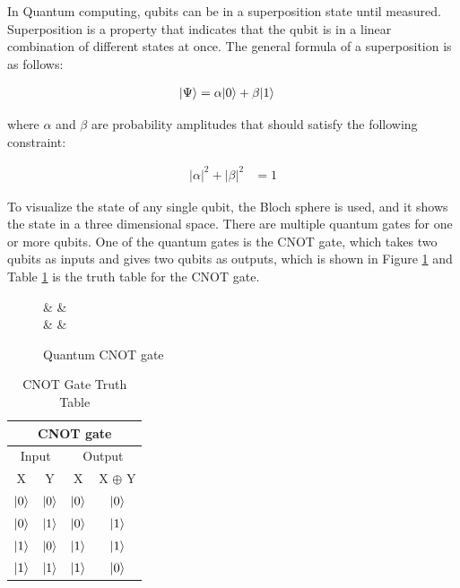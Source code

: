 \documentclass[12pt,a4paper]{article}
\DeclarePairedDelimiter\ket{\lvert}{\rangle}
\begin{document}
	In Quantum computing, qubits can be in a superposition state until measured. Superposition is a property that indicates that the qubit is in a linear combination of different states at once. The general formula of a superposition is as follows:
	
	\begin{align*}
		\ket{\Psi} &= \alpha\ket{0} + \beta\ket{1} 
	\end{align*}
	
	where $\alpha$ and $\beta$ are probability amplitudes that should satisfy the following constraint:
	
	\begin{align*}
		|\alpha|^2 + |\beta|^2 &= 1
	\end{align*}
	
	To visualize the state of any single qubit, the Bloch sphere is used, and it shows the state in a three dimensional space. There are multiple quantum gates for one or more qubits. One of the quantum gates is the CNOT gate, which takes two qubits as inputs and gives two qubits as outputs, which is shown in Figure \ref{fig:1} and Table \ref{table:1} is the truth table for the CNOT gate.
	
	\begin{figure}[H]
		\centering
		\begin{quantikz}[row sep={9mm,between origins}]
			 &  &  \\
			 & \targ{} &  \oplus {}
		\end{quantikz}
		\caption{Quantum CNOT gate}
		\label{fig:1}
	\end{figure}
	
	\begin{table}[H]
		\centering
		\begin{tabular}{|c c c c|} 
			\hline
			\multicolumn{4}{|c|}{CNOT gate} \\ [0.5ex]
			\hline
			\multicolumn{2}{|c|}{Input} & \multicolumn{2}{c|}{Output} \\ [0.5ex] 
			\hline
			\multicolumn{1}{|c|}{X} & \multicolumn{1}{|c|}{Y} & \multicolumn{1}{|c|}{X} & \multicolumn{1}{|c|}{X $\oplus$ Y} \\ [0.5ex] 
			\hline
			\multicolumn{1}{|c}{ $\ket{0}$} & \multicolumn{1}{|c|}{ $\ket{0}$} & \multicolumn{1}{|c|}{ $\ket{0}$} & \multicolumn{1}{c|}{ $\ket{0}$} \\ 
			\hline
			\multicolumn{1}{|c}{ $\ket{0}$} & \multicolumn{1}{|c|}{ $\ket{1}$} & \multicolumn{1}{|c|}{ $\ket{0}$} & \multicolumn{1}{c|}{$\ket{1}$} \\ 
			\hline
			\multicolumn{1}{|c}{$\ket{1}$} & \multicolumn{1}{|c|}{ $\ket{0}$} & \multicolumn{1}{|c|}{$\ket{1}$} & \multicolumn{1}{c|}{$\ket{1}$} \\ 
			\hline
			\multicolumn{1}{|c}{$\ket{1}$} & \multicolumn{1}{|c|}{$\ket{1}$} & \multicolumn{1}{|c|}{$\ket{1}$} & \multicolumn{1}{c|}{ $\ket{0}$} \\ 
			\hline
		\end{tabular}
		\caption{CNOT Gate Truth Table}
		\label{table:1}
	\end{table}
	
\end{document}
